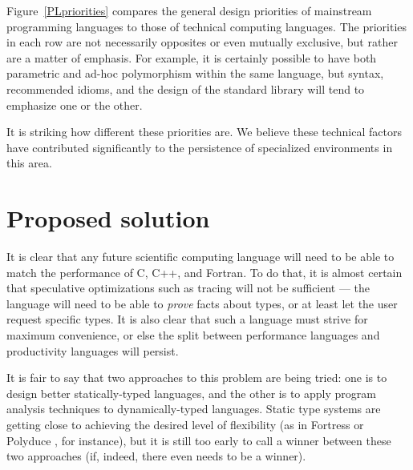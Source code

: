 Figure~\ref{PLpriorities} compares the general design priorities of mainstream programming
languages to those of technical computing languages. The priorities in each row are not
necessarily opposites or even mutually exclusive, but rather are a matter of emphasis.
For example, it is certainly possible to have both parametric and ad-hoc polymorphism within
the same language, but syntax, recommended idioms, and the design of the standard library will
tend to emphasize one or the other.

It is striking how different these priorities are. We believe these technical factors have
contributed significantly to the persistence of specialized environments in this area.





\section{Proposed solution}

It is clear that any future scientific computing language will need to be able to
match the performance of C, C++, and Fortran. To do that, it is almost certain
that speculative optimizations such as tracing \cite{tracingjit} will not be sufficient ---
the language will need to be able to \emph{prove} facts about types, or at least
let the user request specific types. It is also clear that such a language must
strive for maximum convenience, or else the split between performance languages
and productivity languages will persist.

It is fair to say that two approaches to this problem are being tried: one is
to design better statically-typed languages, and the other is to apply
program analysis techniques to dynamically-typed languages.
Static type systems are getting close to achieving the desired level
of flexibility (as in Fortress \cite{fortresspec} or Polyduce \cite{polyduce1},
for instance), but it is still too early to call a winner between these two
approaches (if, indeed, there even needs to be a winner).

